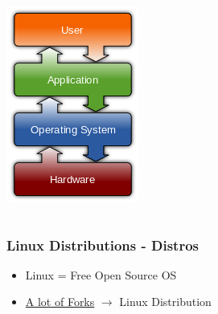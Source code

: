 \begin{frame}
\begin{columns}[c]
			\includegraphics[width=.9\linewidth,]{res/os}
    \end{columns}


	
\end{frame}

\begin{frame}
	\frametitle{Linux Distributions - Distros}

	\begin{itemize}
		\item Linux = Free Open Source OS
        \item \href{https://upload.wikimedia.org/wikipedia/commons/1/1b/Linux_Distribution_Timeline.svg}{A lot of Forks} $\rightarrow$ Linux Distribution
	\end{itemize}
	
	\vfill
	
	\centering 
	
\end{frame}

